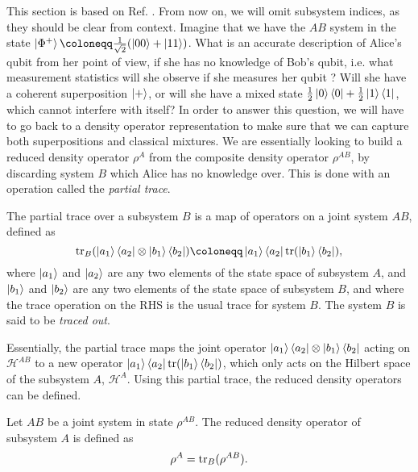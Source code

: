 This section is based on Ref. \cite[pp. 105-109]{nielsen_quantum_2010}. From now on, we will omit subsystem indices, as they should be clear from context. Imagine that we have the $AB$ system in the state $\ket{\Phi^+} \coloneqq \frac{1}{\sqrt{2}}(\ket{00} + \ket{11})$. What is an accurate description of Alice's qubit from her point of view, if she has no knowledge of Bob's qubit, i.e. what measurement statistics will she observe if she measures her qubit ? Will she have a coherent superposition $\ket{+}$, or will she have a mixed state $\frac{1}{2}\ket{0}\bra{0} + \frac{1}{2} \ket{1}\bra{1}$, which cannot interfere with itself?  In order to answer this question, we will have to go back to a density operator representation to make sure that we can capture both superpositions and classical mixtures. We are essentially looking to build a reduced density operator $\rho^A$ from the composite density operator $\rho^{AB}$, by discarding system $B$ which Alice has no knowledge over. This is done with an operation called the \textit{partial trace}.


\begin{definition} %
    The partial trace over a subsystem $B$ is a map of operators on a joint system $AB$, defined as
    \begin{equation}
        \tr_B (\ket{a_1}\bra{a_2} \otimes \ket{b_1}\bra{b_2}) \coloneqq \ket{a_1}\bra{a_2} \tr(\ket{b_1}\bra{b_2}),
    \end{equation}
    where $\ket{a_1}$ and $\ket{a_2}$ are any two elements of the state space of subsystem $A$, and $\ket{b_1}$ and $\ket{b_2}$ are any two elements of the state space of subsystem $B$, and where the trace operation on the RHS is the usual trace for system $B$. The system $B$ is said to be \textit{traced out}.
\end{definition}

Essentially, the partial trace maps the joint operator $\ket{a_1}\bra{a_2} \otimes \ket{b_1}\bra{b_2}$ acting on $\mathcal{H}^{AB}$ to a new operator $\ket{a_1}\bra{a_2} \operatorname{tr}(\ket{b_1}\bra{b_2})$, which only acts on the Hilbert space of the subsystem $A$, $\mathcal{H}^A$. Using this partial trace, the reduced density operators can be defined.

\begin{definition}
    Let $AB$ be a joint system in state $\rho^{AB}$. The reduced density operator of subsystem $A$ is defined as
    \begin{equation}
        \rho^A = \operatorname{tr}_B(\rho^{AB}).
    \end{equation}
\end{definition}

